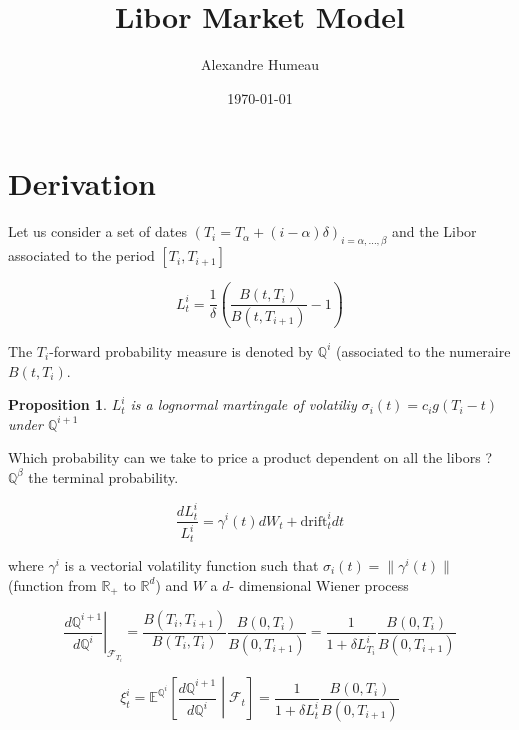 \documentclass{article}
\newtheorem{proposition}[theorem]{Proposition}
\begin{document}
\title{Libor Market Model}
\author{Alexandre Humeau}
\date{\today}
\maketitle

\section{Derivation}

\noindent Let us consider a set of dates $(T_i = T_\alpha + (i - \alpha) \delta)_{i=\alpha,\dots,\beta}$ and the Libor associated to the period $\left[T_i, T_{i+1}\right]$

\begin{equation*}
	L_t^i = \frac{1}{\delta} \left(\frac{B\left(t,T_i\right)}{B\left(t,T_{i+1}\right)}-1\right)
\end{equation*}

\noindent The $T_i$-forward probability measure is denoted by $\mathbb{Q}^i$ (associated to the numeraire $B(t,T_i)$.

\begin{proposition}
	$L_t^i$ is a lognormal martingale of volatiliy $\sigma_i(t) = c_i g(T_i-t)$ under $\mathbb{Q}^{i+1}$
\end{proposition}

Which probability can we take to price a product dependent on all the libors ? $\mathbb{Q}^\beta$ the terminal probability.

\begin{equation}
	\frac{dL_t^i}{L_t^i} = \gamma^i(t) dW_t + \text{drift}^i_t dt
\end{equation}

where $\gamma^i$ is a vectorial volatility function such that $\sigma_i(t) = \|\gamma^i(t)\|$ (function from $\mathbb{R}_+$ to $\mathbb{R}^d$) and $W$ a $d$- dimensional Wiener process

\begin{equation*}
	\left.\frac{d\mathbb{Q}^{i+1}}{d\mathbb{Q}^i} \right|_{\mathcal{F}_{T_i}} = \frac{B\left(T_i,T_{i+1}\right)}{B\left(T_i,T_i\right)}\frac{B\left(0,T_i\right)}{B\left(0,T_{i+1}\right)} = \frac{1}{1 + \delta L_{T_i}^i}\frac{B\left(0,T_i\right)}  {B\left(0,T_{i+1}\right)}
\end{equation*}

\begin{equation*}
	\xi_t^i = \mathbb{E}^{\mathbb{Q}^i} \left[\frac{d\mathbb{Q}^{i+1}}{d\mathbb{Q}^i}\middle|\mathcal{F}_t\right] =  \frac{1}{1 + \delta L_{t}^i}\frac{B\left(0,T_i\right)}  {B\left(0,T_{i+1}\right)}
\end{equation*}
\end{document}
